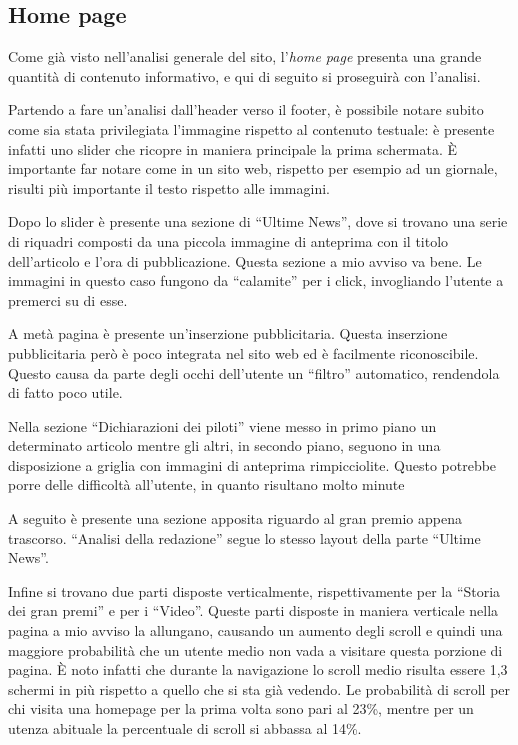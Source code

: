 \subsection{Home page}
Come già visto nell'analisi generale del sito, l'\textit{home page} presenta
una grande quantità di contenuto informativo, e qui di seguito si proseguirà con
l'analisi.

Partendo a fare un'analisi dall'header verso il footer, è possibile notare
subito come sia stata privilegiata l'immagine rispetto al contenuto testuale:
è presente infatti uno slider che ricopre in maniera principale la prima
schermata. È importante far notare come in un sito web, rispetto
per esempio ad un giornale, risulti più importante il testo rispetto alle
immagini.

Dopo lo slider è presente una sezione di ``Ultime News'', dove si trovano
una serie di riquadri composti da una piccola immagine di anteprima con il
titolo dell'articolo e l'ora di pubblicazione. Questa sezione a mio avviso va
bene. Le immagini in questo caso fungono da ``calamite'' per i click,
invogliando l'utente a premerci su di esse.

A metà pagina è presente un'inserzione pubblicitaria. Questa inserzione
pubblicitaria però è poco integrata nel sito web ed è facilmente riconoscibile.
Questo causa da parte degli occhi dell'utente un ``filtro'' automatico,
rendendola di fatto poco utile.

Nella sezione ``Dichiarazioni dei piloti'' viene messo in primo piano un
determinato articolo mentre gli altri, in secondo piano, seguono in una
disposizione a griglia con immagini di anteprima rimpicciolite. Questo potrebbe
porre delle difficoltà all'utente, in quanto risultano molto minute

A seguito è presente una sezione apposita riguardo al gran premio appena
trascorso. ``Analisi della redazione'' segue lo stesso layout della parte
``Ultime News''.

Infine si trovano due parti disposte verticalmente, rispettivamente per la
``Storia dei gran premi'' e per i ``Video''. Queste parti disposte in maniera
verticale nella pagina a mio avviso la allungano, causando un aumento degli
scroll e quindi una maggiore probabilità che un utente medio non vada a visitare
questa porzione di pagina. È noto infatti che durante la navigazione lo scroll
medio risulta essere 1,3 schermi in più rispetto a quello che si sta già
vedendo. Le probabilità di scroll per chi visita una homepage per la prima
volta sono pari al 23\%, mentre per un utenza abituale la percentuale di scroll
si abbassa al 14\%.

